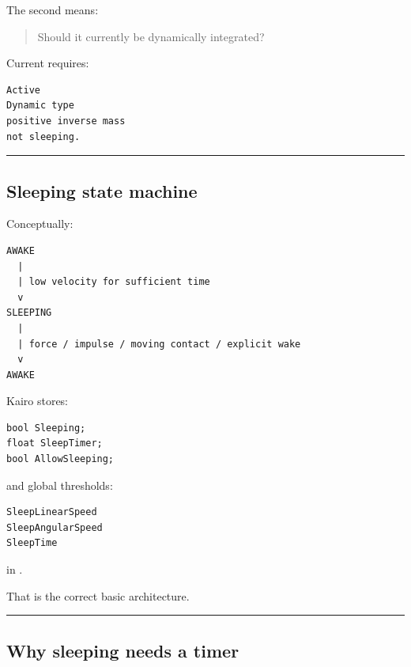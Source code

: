The second means:

\begin{quote}
Should it currently be dynamically integrated?
\end{quote}

Current  requires:

\begin{verbatim}
Active
Dynamic type
positive inverse mass
not sleeping.
\end{verbatim}

\begin{center}\rule{0.5\linewidth}{0.5pt}\end{center}

\subsection{Sleeping state machine}\label{06-engine-ii-ch037-sleeping-state-machine}

\hypertarget{06-engine-ii-ch037-sleeping-state-machine}{}

Conceptually:

\begin{verbatim}
AWAKE
  |
  | low velocity for sufficient time
  v
SLEEPING
  |
  | force / impulse / moving contact / explicit wake
  v
AWAKE
\end{verbatim}

Kairo stores:

\begin{verbatim}
bool Sleeping;
float SleepTimer;
bool AllowSleeping;
\end{verbatim}

and global thresholds:

\begin{verbatim}
SleepLinearSpeed
SleepAngularSpeed
SleepTime
\end{verbatim}

in .

That is the correct basic architecture.

\begin{center}\rule{0.5\linewidth}{0.5pt}\end{center}

\subsection{Why sleeping needs a timer}\label{06-engine-ii-ch037-why-sleeping-needs-a-timer}

